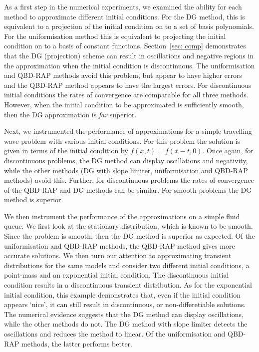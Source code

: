 As a first step in the numerical experiments, we examined the ability for each method to approximate different initial conditions. For the DG method, this is equivalent to a projection of the initial condition on to a set of basis polynomials. For the uniformisation method this is equivalent to projecting the initial condition on to a basis of constant functions. Section~\ref{sec: comp} demonstrates that the DG (projection) scheme can result in oscillations and negative regions in the approximation when the initial condition is discontinuous. The uniformisation and QBD-RAP methods avoid this problem, but appear to have higher errors and the QBD-RAP method appears to have the largest errors. For discontinuous initial conditions the rates of convergence are comparable for all three methods. However, when the initial condition to be approximated is sufficiently smooth, then the DG approximation is \emph{far} superior. 

Next, we instrumented the performance of approximations for a simple travelling wave problem with various initial conditions. For this problem the solution is given in terms of the initial condition by \(f(x,t) = f(x-t,0)\). Once again, for discontinuous problems, the DG method can display oscillations and negativity, while the other methods (DG with slope limiter, uniformisation and QBD-RAP methods) avoid this. Further, for discontinuous problems the rates of convergence of the QBD-RAP and DG methods can be similar. For smooth problems the DG method is superior. 

We then instrument the performance of the approximations on a simple fluid queue. We first look at the stationary distribution, which is known to be smooth. Since the problem is smooth, then the DG method is superior as expected. Of the uniformisation and QBD-RAP methods, the QBD-RAP method gives more accurate solutions. We then turn our attention to approximating transient distributions for the same models and consider two different initial conditions, a point-mass and an exponential initial condition. The discontinuous initial condition results in a discontinuous transient distribution. As for the exponential initial condition, this example demonstrates that, even if the initial condition appears `nice', it can still result in discontinuous, or non-differetiable solutions. The numerical evidence suggests that the DG method can display oscillations, while the other methods do not. The DG method with slope limiter detects the oscillations and reduces the method to linear. Of the uniformisation and QBD-RAP methods, the latter performs better. 

